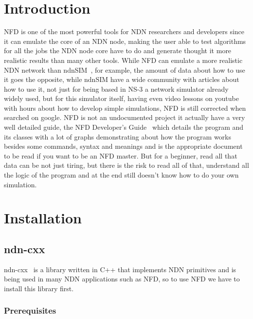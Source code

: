 \documentclass[10pt,letterpaper,extrafontsizes]{memoir}
\begin{document}
\chapter{Introduction}
NFD is one of the most powerful tools for NDN researchers and developers since it can emulate the core of an NDN node, making the user able to test algorithms for all the jobs the NDN node core have to do and generate thought it more realistic results than many other tools. While NFD can emulate a more realistic NDN network than ndnSIM~\cite{ndnsim}, for example, the amount of data about how to use it goes the opposite, while ndnSIM have a wide community with articles about how to use it, not just for being based in NS-3 a network simulator already widely used, but for this simulator itself, having even video lessons on youtube with hours about how to develop simple simulations, NFD is still corrected when searched on google.
NFD is not an undocumented project it actually have a very well detailed guide, the NFD Developer's Guide~\cite{devguide} which details the program and its classes with a lot of graphs demonstrating about how the program works besides some commands, syntax and meanings and is the appropriate document to be read if you want to be an NFD master. But for a beginner, read all that data can be not just tiring, but there is the risk to read all of that, understand all the logic of the program and at the end still doesn't know how to do your own simulation.  

\chapter{Installation}
\section{ndn-cxx}
	ndn-cxx~\cite{ndncxx} is a library written in C++ that implements NDN primitives and is being used in many NDN applications such as NFD, so to use NFD we have to install this library first.
	\subsection{Prerequisites}
	
\end{document}

